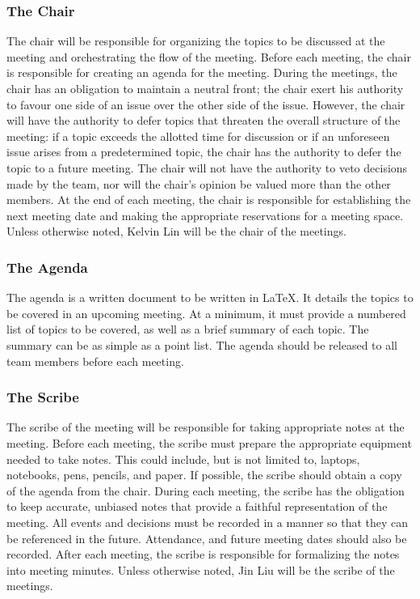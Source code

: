 \documentclass{article}
\begin{document}
\subsubsection{The Chair}
The chair will be responsible for organizing the topics to be discussed at the 
meeting and orchestrating the flow of the meeting. Before each meeting, the 
chair is responsible for creating an agenda for the meeting. During the 
meetings, the chair has an obligation to maintain a neutral front; the chair 
exert his authority to favour one side of an issue over the other side of the 
issue. However, the chair will have the authority to defer topics that threaten 
the overall structure of the meeting: if a topic exceeds the allotted time for 
discussion or if an unforeseen issue arises from a predetermined topic, the 
chair has the authority to defer the topic to a future meeting. The chair will 
not have the authority to veto decisions made by the team, nor will the chair's 
opinion be valued more than the other members. At the end of each meeting, the 
chair is responsible for establishing the next meeting date and making the 
appropriate reservations for a meeting space. Unless otherwise noted, Kelvin Lin 
will be the chair of the meetings.

\subsubsection{The Agenda}
The agenda is a written document to be written in \LaTeX. It details the topics 
to be covered in an upcoming meeting. At a minimum, it must provide a numbered 
list of topics to be covered, as well as a brief summary of each topic. The 
summary can be as simple as a point list. The agenda should be released to all 
team members 
before each meeting.

\subsubsection{The Scribe}
The scribe of the meeting will be responsible for taking appropriate notes at 
the meeting. Before each meeting, the scribe must prepare the appropriate 
equipment needed to take notes. This could include, but is not limited to, 
laptops, notebooks, pens, pencils, and paper. If possible, the scribe should 
obtain a copy of the agenda from the chair. During each meeting, the scribe has 
the obligation to keep accurate, unbiased notes that provide a faithful 
representation of the meeting. All events and decisions must be recorded in a 
manner so that they can be referenced in the future. Attendance, and future 
meeting dates should also be recorded. After each meeting, the scribe is 
responsible for formalizing the notes into meeting minutes. Unless otherwise 
noted, Jin Liu will be the scribe of the meetings.
\end{document}
